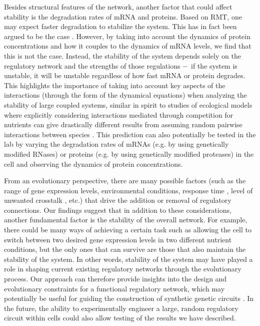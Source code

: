 \documentclass[10pt]{article}
\begin{document}
Besides structural features of the network, another factor that could affect stability is the degradation rates of mRNA and proteins. Based on RMT, one may expect faster degradation to stabilize the system. This has in fact been argued to be the case \cite{chen2019gene, zhao2017weak}. However, by taking into account the dynamics of protein concentrations and how it couples to the dynamics of mRNA levels, we find that this is not the case. Instead, the stability of the system depends solely on the regulatory network and the strengths of those regulations $\--$ if the system is unstable, it will be unstable regardless of how fast mRNA or protein degrades. This highlights the importance of taking into account key aspects of the interactions (through the form of the dynamical equations) when analyzing the stability of large coupled systems, similar in spirit to studies of ecological models where explicitly considering interactions mediated through competition for nutrients can give drastically different results from assuming random pairwise interactions between species \cite{cui2019diverse}. This prediction can also potentially be tested in the lab by varying the degradation rates of mRNAs (e.g. by using genetically modified RNases) or proteins (e.g. by using genetically modified proteases) in the cell and observing the dynamics of protein concentrations.


From an evolutionary perspective, there are many possible factors (such as the range of gene expression levels, environmental conditions, response time \cite{van2014lost, erickson2017global}, level of unwanted crosstalk \cite{friedlander2016intrinsic}, etc.) that drive the addition or removal of regulatory connections. Our findings suggest that in addition to these considerations, another fundamental factor is the stability of the overall network. For example, there could be many ways of achieving a certain task such as allowing the cell to switch between two desired gene expression levels in two different nutrient conditions, but the only ones that can survive are those that also maintain the stability of the system. In other words, stability of the system may have played a role in shaping current existing regulatory networks through the evolutionary process. Our approach can therefore provide insights into the design and evolutionary constraints for a functional regulatory network, which may potentially be useful for guiding the construction of synthetic genetic circuits \cite{adamala2017engineering, ellis2009diversity, noireaux2011development}. In the future, the ability to experimentally engineer a large, random regulatory circuit within cells could also allow testing of the results we have described.  
\end{document}
